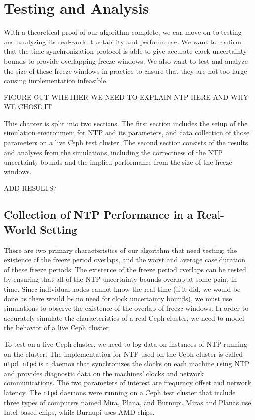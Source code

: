 \chapter{Testing and Analysis}
\label{sec:results}

With a theoretical proof of our algorithm complete, we can move on to
testing and analyzing its real-world tractability and performance. We want to
confirm that the time synchronization protocol is able to give accurate clock
uncertainty bounds to provide overlapping freeze windows. We also
want to test and analyze the size of these freeze windows in practice
to ensure that they are not too large causing implementation infeasible.

FIGURE OUT WHETHER WE NEED TO EXPLAIN NTP HERE AND WHY WE CHOSE IT

This chapter is split into two sections. The first section includes
the setup of the simulation environment for NTP and its parameters,
and data collection of those parameters on a live Ceph test cluster.
The second section consists of the results and analyses from the simulations,
including the correctness of the NTP uncertainty bounds and the implied
performance from the size of the freeze windows.

ADD RESULTS?



\section{Collection of NTP Performance in a Real-World Setting}

There are two primary characteristics of our algorithm that need
testing: the existence of the freeze period overlaps, and the 
worst and average case duration of these freeze periods. 
The existence of the freeze period overlaps can be tested by 
ensuring that all of the NTP uncertainty bounds overlap at some 
point in time. Since individual nodes cannot know the real time
(if it did, we would be done as there would be no need for clock uncertainty
bounds), we must use simulations to observe the existence of 
the overlap of freeze windows. In order to accurately simulate the
characteristics of a real Ceph cluster, we need to model the
behavior of a live Ceph cluster.

To test on a live Ceph cluster, we need to log data on 
instances of NTP running on the cluster. The implementation for NTP 
used on the Ceph cluster is called \texttt{ntpd}. \texttt{ntpd} is a
daemon that synchronizes the clocks on each machine using NTP and
provides diagnostic data on the machines' clocks and network 
communications. The two parameters of interest are frequency offset and
network latency. The \texttt{ntpd} daemons were running on a Ceph
test cluster that include three types of computers named Mira,
Plana, and Burnupi. Miras and Planas use Intel-based chips, while
Burnupi uses AMD chips.

